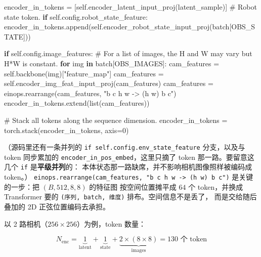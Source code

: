 \documentclass[
  chinese,
]{ctexart}
\newenvironment{Shaded}{\begin{snugshade}}{\end{snugshade}}
\newcommand{\BuiltInTok}[1]{\textcolor[rgb]{0.00,0.23,0.31}{#1}}
\newcommand{\CommentTok}[1]{\textcolor[rgb]{0.37,0.37,0.37}{#1}}
\newcommand{\ControlFlowTok}[1]{\textcolor[rgb]{0.00,0.23,0.31}{\textbf{#1}}}
\newcommand{\DecValTok}[1]{\textcolor[rgb]{0.68,0.00,0.00}{#1}}
\newcommand{\KeywordTok}[1]{\textcolor[rgb]{0.00,0.23,0.31}{\textbf{#1}}}
\newcommand{\NormalTok}[1]{\textcolor[rgb]{0.00,0.23,0.31}{#1}}
\newcommand{\OperatorTok}[1]{\textcolor[rgb]{0.37,0.37,0.37}{#1}}
\newcommand{\StringTok}[1]{\textcolor[rgb]{0.13,0.47,0.30}{#1}}
\newcommand{\VariableTok}[1]{\textcolor[rgb]{0.07,0.07,0.07}{#1}}
\begin{document}
\begin{Shaded}
\begin{Highlighting}[]
\NormalTok{        encoder\_in\_tokens }\OperatorTok{=}\NormalTok{ [}\VariableTok{self}\NormalTok{.encoder\_latent\_input\_proj(latent\_sample)]}
        \CommentTok{\# Robot state token.}
        \ControlFlowTok{if} \VariableTok{self}\NormalTok{.config.robot\_state\_feature:}
\NormalTok{            encoder\_in\_tokens.append(}\VariableTok{self}\NormalTok{.encoder\_robot\_state\_input\_proj(batch[OBS\_STATE]))}

        \ControlFlowTok{if} \VariableTok{self}\NormalTok{.config.image\_features:}
            \CommentTok{\# For a list of images, the H and W may vary but H*W is constant.}
            \ControlFlowTok{for}\NormalTok{ img }\KeywordTok{in}\NormalTok{ batch[OBS\_IMAGES]:}
\NormalTok{                cam\_features }\OperatorTok{=} \VariableTok{self}\NormalTok{.backbone(img)[}\StringTok{"feature\_map"}\NormalTok{]}
\NormalTok{                cam\_features }\OperatorTok{=} \VariableTok{self}\NormalTok{.encoder\_img\_feat\_input\_proj(cam\_features)}
\NormalTok{                cam\_features }\OperatorTok{=}\NormalTok{ einops.rearrange(cam\_features, }\StringTok{"b c h w {-}\textgreater{} (h w) b c"}\NormalTok{)}
\NormalTok{                encoder\_in\_tokens.extend(}\BuiltInTok{list}\NormalTok{(cam\_features))}

        \CommentTok{\# Stack all tokens along the sequence dimension.}
\NormalTok{        encoder\_in\_tokens }\OperatorTok{=}\NormalTok{ torch.stack(encoder\_in\_tokens, axis}\OperatorTok{=}\DecValTok{0}\NormalTok{)}
\end{Highlighting}
\end{Shaded}

（源码里还有一条并列的 \texttt{if\ self.config.env\_state\_feature}
分支，以及与 token 同步累加的
\texttt{encoder\_in\_pos\_embed}，这里只摘了 token 那一路。要留意这几个
\texttt{if} 是\textbf{平级并列}的：
本体状态那一路缺席，并不影响相机图像照样被编码成 token。）
\texttt{einops.rearrange(cam\_features,\ "b\ c\ h\ w\ -\textgreater{}\ (h\ w)\ b\ c")}
是关键的一步：把 \((B, 512, 8, 8)\) 的特征图 按空间位置摊平成 \(64\) 个
token，并换成 Transformer 要的 \texttt{(序列,\ batch,\ 维度)}
排布。空间信息不是丢了， 而是交给随后叠加的 2D 正弦位置编码去承担。

以 2 路相机（\(256 \times 256\)）为例，token 数量：

\[
N_{\text{enc}} = \underbrace{1}_{\text{latent}} + \underbrace{1}_{\text{state}} + \underbrace{2 \times (8 \times 8)}_{\text{images}} = 130 \text{ 个 token}
\]
\end{document}
